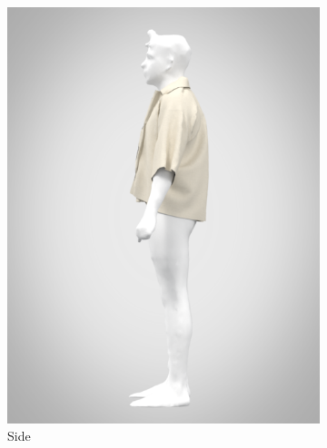 \begin{figure}[H]
\begin{subfigure}[b]{0.3\textwidth}
        \centering
        \includegraphics[width=\textwidth]{Images/renderside.png}
        \caption{Side}
    \end{subfigure}
    \hfill
    \begin{subfigure}[b]{0.3\textwidth}
        \centering

\end{subfigure}
\end{figure}
